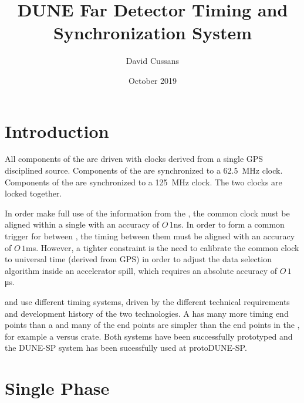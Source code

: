 \documentclass{article}
\title{DUNE Far Detector Timing and Synchronization System}
\author{David Cussans }
\date{October 2019}
\begin{document}
\maketitle

\section{Introduction}




All components of the  are driven with clocks derived from a single GPS disciplined source. Components of the  are
synchronized to a \SI{62.5}{\MHz} clock. Components of the  are synchronized to a \SI{125}{\MHz} clock. The two clocks are locked together.

In order make full use of the
information from the , the common clock must be
aligned within a single  with an accuracy of $O\,1$\si{ns}.
In order to form a common trigger for  between
, the timing between them must be aligned with an
accuracy of $O\,1$\si{ms}.  However, a tighter constraint is the need to
calibrate the common clock to universal time (derived from GPS) in
order to adjust the data selection algorithm inside an accelerator
spill, which requires an absolute accuracy of $O\,1$\si{\micro\s}.

\single and \dual {} use different timing systems,
driven by the different technical requirements and development history
of the two technologies. %
A  has many more
timing end points than a  and many of the end points
are simpler than the end points in the \dual{}, for example a 
versus  crate. Both systems have been successfully prototyped and the DUNE-SP system has been sucessfully used at protoDUNE-SP.

\section{Single Phase}
\end{document}
